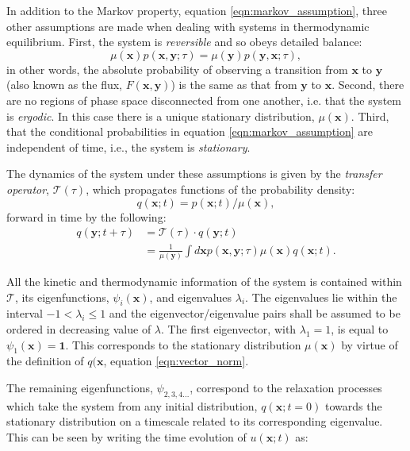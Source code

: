 In addition to the Markov property, equation \ref{eqn:markov_assumption}, three other assumptions are made when dealing with systems in thermodynamic equilibrium. First, the system is \emph{reversible} and so obeys detailed balance: 
\begin{equation}\label{eqn:detailed_balance}
\mu(\mathbf{x}) p(\mathbf{x}, \mathbf{y} ; \tau)=\mu(\mathbf{y}) p(\mathbf{y}, \mathbf{x} ; \tau), 
\end{equation}
in other words, the absolute probability of observing a transition from $\mathbf{x}$ to $\mathbf{y}$ (also known as the flux, $F(\mathbf{x}, \mathbf{y})$) is the same as that from $\mathbf{y}$ to $\mathbf{x}$. Second, there are no regions of phase space disconnected from one another, i.e. that the system is \emph{ergodic}. In this case there is a unique stationary distribution,  $\mu(\mathbf{x})$. Third, that the conditional probabilities in equation \ref{eqn:markov_assumption} are independent of time, i.e., the system is \emph{stationary}. 

The dynamics of the system under these assumptions is given by the \emph{transfer operator}, $\mathcal{T}(\tau)$, which propagates functions of the probability density: 
\begin{equation}\label{eqn:vector_norm}
    q(\mathbf{x} ; t) = p(\mathbf{x} ; t)/\mu(\mathbf{x}),
\end{equation}
forward in time by the following: 
\begin{equation}\label{eqn:transfer_operator}
\begin{split}
   q(\mathbf{y} ; t+\tau) &= \mathcal{T}(\tau) \cdot q(\mathbf{y} ; t) \\
   &=\frac{1}{\mu(\mathbf{y})} \int d \mathbf{x} p(\mathbf{x}, \mathbf{y} ; \tau) \mu(\mathbf{x}) q(\mathbf{x} ; t). 
\end{split}
\end{equation}

All the kinetic and thermodynamic information of the system is contained within $\mathcal{T}$, its eigenfunctions, $\psi_{i}(\mathbf{x})$, and eigenvalues $\lambda_{i}$. The eigenvalues lie within the interval $-1 < \lambda_i \le 1$ and the eigenvector/eigenvalue pairs shall be assumed to be ordered in decreasing value of $\lambda$. The first eigenvector, with $\lambda_{1}=1$, is equal to $\psi_{1}(\mathbf{x})=\mathbf{1}$. This corresponds to the stationary distribution $\mu(\mathbf{x})$ by virtue of the definition of $q(\mathbf{x}$, equation \ref{eqn:vector_norm}. 

The remaining eigenfunctions, $\psi_{2,3,4...}$, correspond to the relaxation processes which take the system from any initial distribution, $q(\mathbf{x} ; t=0)$ towards the stationary distribution on a timescale related to its corresponding eigenvalue. This can be seen by writing the time evolution of $u(\mathbf{x};t)$ as:

